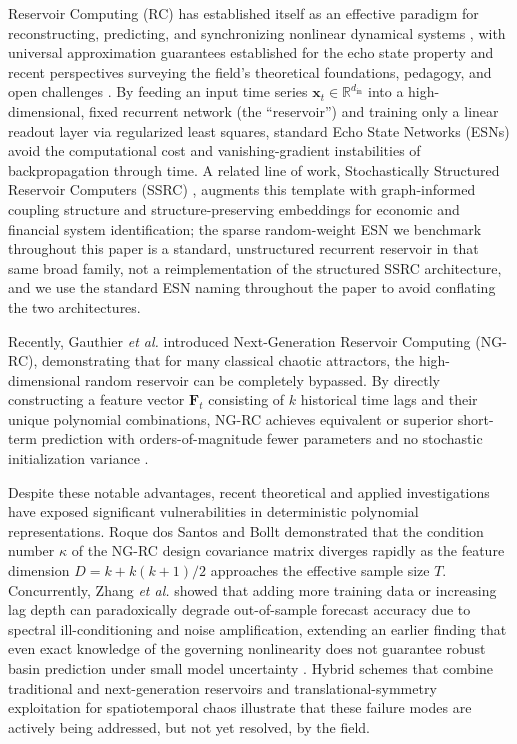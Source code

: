 \documentclass[aip,cha,reprint,amsmath,amssymb]{revtex4-2}
\begin{document}
Reservoir Computing (RC) has established itself as an effective paradigm for reconstructing, predicting, and synchronizing nonlinear dynamical systems \cite{jaeger2001echo,maass2002realtime,nakajima2021reservoir,yildiz2012revisiting,pathak2018model}, with universal approximation guarantees established for the echo state property \cite{grigoryevaortega2018echostate,gonon2023approximation} and recent perspectives surveying the field's theoretical foundations, pedagogy, and open challenges \cite{yan2024emerging,amann2026nonlinear,inoue2026bootcamp,schotz2026machine}. By feeding an input time series $\mathbf{x}_t \in \mathbb{R}^{d_{\text{in}}}$ into a high-dimensional, fixed recurrent network (the ``reservoir'') and training only a linear readout layer via regularized least squares, standard Echo State Networks (ESNs) avoid the computational cost and vanishing-gradient instabilities of backpropagation through time. A related line of work, Stochastically Structured Reservoir Computers (SSRC) \cite{banegas2025ssrc}, augments this template with graph-informed coupling structure and structure-preserving embeddings for economic and financial system identification; the sparse random-weight ESN we benchmark throughout this paper is a standard, unstructured recurrent reservoir in that same broad family, not a reimplementation of the structured SSRC architecture, and we use the standard ESN naming throughout the paper to avoid conflating the two architectures.

Recently, Gauthier \emph{et al.} \cite{gauthier2021next} introduced Next-Generation Reservoir Computing (NG-RC), demonstrating that for many classical chaotic attractors, the high-dimensional random reservoir can be completely bypassed. By directly constructing a feature vector $\mathbf{F}_t$ consisting of $k$ historical time lags and their unique polynomial combinations, NG-RC achieves equivalent or superior short-term prediction with orders-of-magnitude fewer parameters and no stochastic initialization variance \cite{bollt2021explaining}.

Despite these notable advantages, recent theoretical and applied investigations have exposed significant vulnerabilities in deterministic polynomial representations. Roque dos Santos and Bollt \cite{dossantos2025instability} demonstrated that the condition number $\kappa$ of the NG-RC design covariance matrix diverges rapidly as the feature dimension $D = k + k(k+1)/2$ approaches the effective sample size $T$. Concurrently, Zhang \emph{et al.} \cite{zhang2025moredata} showed that adding more training data or increasing lag depth can paradoxically degrade out-of-sample forecast accuracy due to spectral ill-conditioning and noise amplification, extending an earlier finding that even exact knowledge of the governing nonlinearity does not guarantee robust basin prediction under small model uncertainty \cite{zhangcornelius2023catch22}. Hybrid schemes that combine traditional and next-generation reservoirs \cite{chepuri2024hybridizing} and translational-symmetry exploitation for spatiotemporal chaos \cite{barbosagauthier2022learning} illustrate that these failure modes are actively being addressed, but not yet resolved, by the field.
\end{document}

